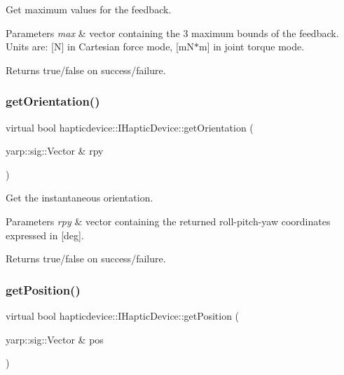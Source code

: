 Get maximum values for the feedback. 


\begin{DoxyParams}{Parameters}
{\em max} & vector containing the 3 maximum bounds of the feedback. Units are\+: \mbox{[}N\mbox{]} in Cartesian force mode, \mbox{[}m\+N$\ast$m\mbox{]} in joint torque mode. \\
\hline
\end{DoxyParams}
\begin{DoxyReturn}{Returns}
true/false on success/failure. 
\end{DoxyReturn}
\label{classhapticdevice_1_1IHapticDevice_a82f18c163da8ca50e564a29cf6b6f06e} 
\subsubsection{\texorpdfstring{get\+Orientation()}{getOrientation()}}
{\footnotesize\ttfamily virtual bool hapticdevice\+::\+I\+Haptic\+Device\+::get\+Orientation (\begin{DoxyParamCaption}\item[{yarp\+::sig\+::\+Vector \&}]{rpy }\end{DoxyParamCaption})\hspace{0.3cm}{\ttfamily [pure virtual]}}



Get the instantaneous orientation. 


\begin{DoxyParams}{Parameters}
{\em rpy} & vector containing the returned roll-\/pitch-\/yaw coordinates expressed in \mbox{[}deg\mbox{]}. \\
\hline
\end{DoxyParams}
\begin{DoxyReturn}{Returns}
true/false on success/failure. 
\end{DoxyReturn}
\label{classhapticdevice_1_1IHapticDevice_a8c0b1835a1d7d501d1d4fa2efbd5ea26} 
\subsubsection{\texorpdfstring{get\+Position()}{getPosition()}}
{\footnotesize\ttfamily virtual bool hapticdevice\+::\+I\+Haptic\+Device\+::get\+Position (\begin{DoxyParamCaption}\item[{yarp\+::sig\+::\+Vector \&}]{pos }\end{DoxyParamCaption})\hspace{0.3cm}{\ttfamily [pure virtual]}}



